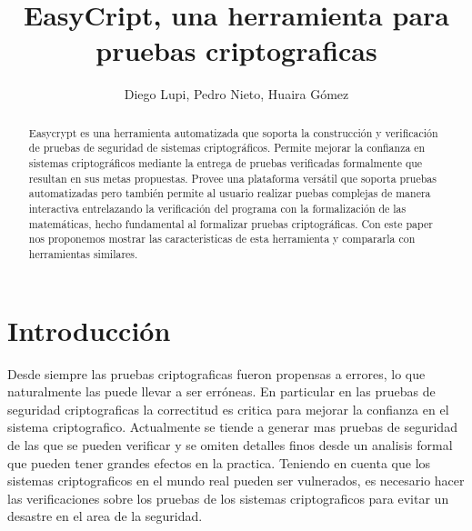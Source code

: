 \documentclass[runningheads]{llncs}
\begin{document}
\title{EasyCript, una herramienta para pruebas criptograficas}

\author{Diego Lupi, Pedro Nieto, Huaira Gómez}


%
%

\maketitle

\begin{abstract}
Easycrypt\cite{ref_article1} es una herramienta automatizada que soporta la construcción y verificación de pruebas de seguridad de sistemas criptográficos. Permite mejorar la confianza en sistemas criptográficos mediante la entrega de pruebas verificadas formalmente que resultan en sus metas propuestas. Provee una plataforma versátil que soporta pruebas automatizadas pero también permite al usuario realizar puebas complejas de manera interactiva entrelazando la verificación del programa con la formalización de las matemáticas, hecho fundamental al formalizar pruebas criptográficas. Con este paper nos proponemos mostrar las caracteristicas de esta herramienta y compararla con herramientas similares.

\end{abstract}
%
%
%
\section{Introducción}
Desde siempre las pruebas criptograficas fueron propensas a errores, lo que naturalmente las puede llevar a ser erróneas.
 En particular en las pruebas de seguridad criptograficas la correctitud es critica para mejorar la confianza en el sistema criptografico. Actualmente se tiende a generar mas pruebas de seguridad de las que se pueden verificar y se omiten detalles finos desde un analisis formal que pueden tener grandes efectos en la practica. Teniendo en cuenta que los sistemas criptograficos en el mundo real pueden ser vulnerados, es necesario hacer las verificaciones sobre los pruebas de los sistemas criptograficos para evitar un desastre en el area de la seguridad.
\end{document}
